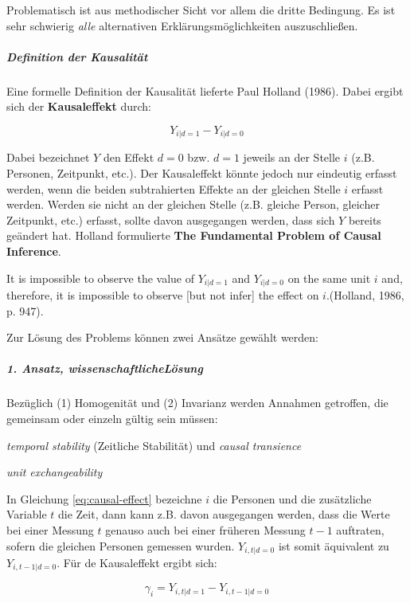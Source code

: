 \documentclass{article}
\numberwithin{equation}{section}
\begin{document}
Problematisch ist aus methodischer Sicht vor allem die dritte Bedingung. Es ist sehr schwierig \emph{alle} alternativen Erklärungsmöglichkeiten auszuschließen.

\subparagraph{Definition der Kausalität}

Eine formelle Definition der Kausalität lieferte Paul Holland (1986). Dabei ergibt sich der \textbf{Kausaleffekt} durch:

\begin{equation}
\label{eq:causal-effect}
Y_{i|d=1} - Y_{i|d=0}
\end{equation}

Dabei bezeichnet $Y$ den Effekt $d=0$ bzw. $d=1$ jeweils an der Stelle $i$ (z.B. Personen, Zeitpunkt, etc.). Der Kausaleffekt könnte jedoch nur eindeutig erfasst werden, wenn die beiden subtrahierten Effekte an der gleichen Stelle $i$ erfasst werden. Werden sie nicht an der gleichen Stelle (z.B. gleiche Person, gleicher Zeitpunkt, etc.) erfasst, sollte davon ausgegangen werden, dass sich $Y$ bereits geändert hat. Holland formulierte \glqq \textbf{The Fundamental Problem of Causal Inference}\grqq.

\glqq It is impossible to observe the value of $Y_{i|d=1}$ and $Y_{i|d=0}$ on the same unit $i$ and, therefore, it is impossible to observe [but not infer] the effect on $i$.\grqq (Holland, 1986, p. 947).

Zur Lösung des Problems können zwei Ansätze gewählt werden:

\subparagraph{1. Ansatz, \glqq wissenschaftliche\grqq Lösung}

Bezüglich (1) Homogenität und (2) Invarianz werden Annahmen getroffen, die gemeinsam oder einzeln gültig sein müssen:

\begin{compactitem}
\item \emph{temporal stability} (Zeitliche Stabilität) und \emph{causal transience}
\item \emph{unit exchangeability}
\end{compactitem}

In Gleichung \ref{eq:causal-effect} bezeichne $i$ die Personen und die zusätzliche Variable $t$ die Zeit, dann kann z.B. davon ausgegangen werden, dass die Werte bei einer Messung $t$ genauso auch bei einer früheren Messung $t-1$ auftraten, sofern die gleichen Personen gemessen wurden. $Y_{i,t|d=0}$ ist somit äquivalent zu $Y_{i,t-1|d=0}$. Für de Kausaleffekt ergibt sich:

\begin{equation}
\gamma_i = Y_{i,t|d=1} - Y_{i,t-1|d=0}
\end{equation}
\end{document}
